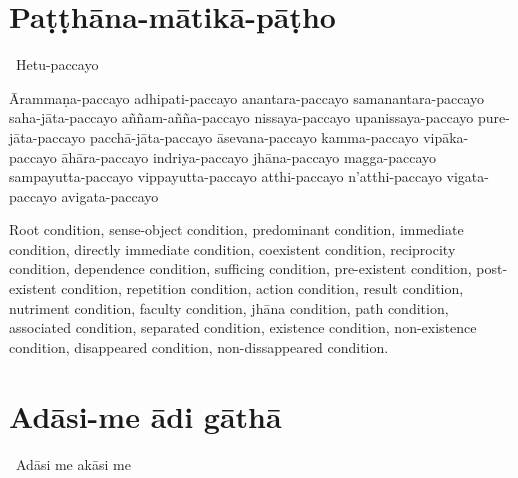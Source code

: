\suttaRef{[SN 12.1]}

\section{Paṭṭhāna-mātikā-pāṭho}
\label{patthana-matika-patho}

\begin{leader-only}
  \anglebracketleft\ \hspace{-0.5mm}Hetu-paccayo \hspace{-0.5mm}\anglebracketright\
\end{leader-only}

\vspace{-0.99em}

\begin{pali-hang}
  Ārammaṇa-paccayo adhipati-paccayo anantara-paccayo samanantara-paccayo saha-jāta-paccayo aññam-añña-paccayo nissaya-paccayo upanissaya-paccayo pure-jāta-paccayo pacchā-jāta-paccayo āsevana-paccayo kamma-paccayo vipāka-paccayo āhāra-paccayo indriya-paccayo jhāna-paccayo magga-paccayo sampayutta-paccayo vippayutta-paccayo atthi-paccayo n'atthi-paccayo vigata-paccayo avigata-paccayo
\end{pali-hang}

\begin{english-hang-verses}
  Root condition, sense-object condition, predominant condition, immediate condition, directly immediate condition, coexistent condition, reciprocity condition, dependence condition, sufficing condition, pre-existent condition, post-existent condition, repetition condition, action condition, result condition, nutriment condition, faculty condition, jhāna condition, path condition, associated condition, separated condition, existence condition, non-existence condition, disappeared condition, non-dissappeared condition.
\end{english-hang-verses}

\suttaRef{[Dhs A]}

\section{Adāsi-me ādi gāthā}
\label{adasi-me-adi-gatha}

\begin{leader-only}
  \anglebracketleft\ \hspace{-0.5mm}Adāsi me akāsi me \hspace{-0.5mm}\anglebracketright\
\end{leader-only}

